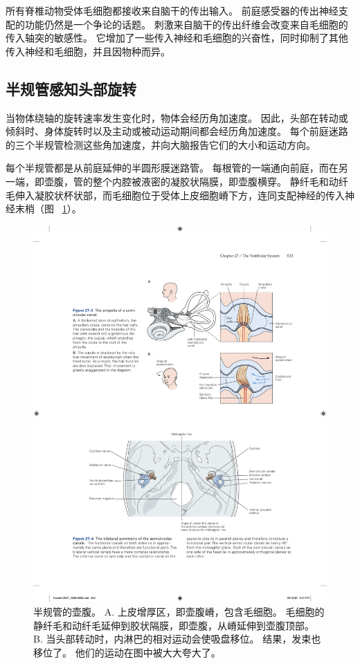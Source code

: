 所有脊椎动物受体毛细胞都接收来自脑干的传出输入。
前庭感受器的传出神经支配的功能仍然是一个争论的话题。
刺激来自脑干的传出纤维会改变来自毛细胞的传入轴突的敏感性。
它增加了一些传入神经和毛细胞的兴奋性，同时抑制了其他传入神经和毛细胞，并且因物种而异。



\subsection{半规管感知头部旋转}

当物体绕轴的旋转速率发生变化时，物体会经历角加速度。
因此，头部在转动或倾斜时、身体旋转时以及主动或被动运动期间都会经历角加速度。
每个前庭迷路的三个半规管检测这些角加速度，并向大脑报告它们的大小和运动方向。


每个半规管都是从前庭延伸的半圆形膜迷路管。
每根管的一端通向前庭，而在另一端，即壶腹，管的整个内腔被液密的凝胶状隔膜，即壶腹横穿。
静纤毛和动纤毛伸入凝胶状杯状部，而毛细胞位于受体上皮细胞嵴下方，连同支配神经的传入神经末梢（图~ \ref{fig:27_3}）。

\begin{figure}[htbp]
	\centering
	\includegraphics[width=0.7\linewidth]{chap27/fig_27_3}
	\caption{半规管的壶腹。 A. 上皮增厚区，即壶腹嵴，包含毛细胞。 毛细胞的静纤毛和动纤毛延伸到胶状隔膜，即壶腹，从嵴延伸到壶腹顶部。 B. 当头部转动时，内淋巴的相对运动会使吸盘移位。 结果，发束也移位了。 他们的运动在图中被大大夸大了。}
	\label{fig:27_3}
\end{figure}


